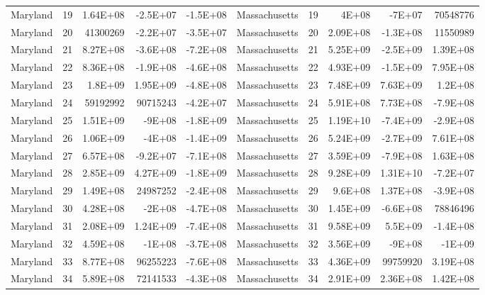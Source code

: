 \begin{landscape}
\begin{singlespace}
\begin{longtable}{lrrrr|lrrrr}
		Maryland &  19 & 1.64E+08 & -2.5E+07 & -1.5E+08 & Massachusetts &  19 & 4E+08 & -7E+07 & 70548776 \\
		Maryland &  20 & 41300269 & -2.2E+07 & -3.5E+07 & Massachusetts &  20 & 2.09E+08 & -1.3E+08 & 11550989 \\
		Maryland &  21 & 8.27E+08 & -3.6E+08 & -7.2E+08 & Massachusetts &  21 & 5.25E+09 & -2.5E+09 & 1.39E+08 \\
		Maryland &  22 & 8.36E+08 & -1.9E+08 & -4.6E+08 & Massachusetts &  22 & 4.93E+09 & -1.5E+09 & 7.95E+08 \\
		Maryland &  23 & 1.8E+09 & 1.95E+09 & -4.8E+08 & Massachusetts &  23 & 7.48E+09 & 7.63E+09 & 1.2E+08 \\
		Maryland &  24 & 59192992 & 90715243 & -4.2E+07 & Massachusetts &  24 & 5.91E+08 & 7.73E+08 & -7.9E+08 \\
		Maryland &  25 & 1.51E+09 & -9E+08 & -1.8E+09 & Massachusetts &  25 & 1.19E+10 & -7.4E+09 & -2.9E+08 \\
		Maryland &  26 & 1.06E+09 & -4E+08 & -1.4E+09 & Massachusetts &  26 & 5.24E+09 & -2.7E+09 & 7.61E+08 \\
		Maryland &  27 & 6.57E+08 & -9.2E+07 & -7.1E+08 & Massachusetts &  27 & 3.59E+09 & -7.9E+08 & 1.63E+08 \\
		Maryland &  28 & 2.85E+09 & 4.27E+09 & -1.8E+09 & Massachusetts &  28 & 9.28E+09 & 1.31E+10 & -7.2E+07 \\
		Maryland &  29 & 1.49E+08 & 24987252 & -2.4E+08 & Massachusetts &  29 & 9.6E+08 & 1.37E+08 & -3.9E+08 \\
		Maryland &  30 & 4.28E+08 & -2E+08 & -4.7E+08 & Massachusetts &  30 & 1.45E+09 & -6.6E+08 & 78846496 \\
		Maryland &  31 & 2.08E+09 & 1.24E+09 & -7.4E+08 & Massachusetts &  31 & 9.58E+09 & 5.5E+09 & -1.4E+08 \\
		Maryland &  32 & 4.59E+08 & -1E+08 & -3.7E+08 & Massachusetts &  32 & 3.56E+09 & -9E+08 & -1E+09 \\
		Maryland &  33 & 8.77E+08 & 96255223 & -7.6E+08 & Massachusetts &  33 & 4.36E+09 & 99759920 & 3.19E+08 \\
		Maryland &  34 & 5.89E+08 & 72141533 & -4.3E+08 & Massachusetts &  34 & 2.91E+09 & 2.36E+08 & 1.42E+08\\


\end{longtable}
\end{singlespace}
\end{landscape}
